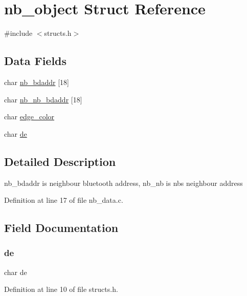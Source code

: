 \hypertarget{structnb__object}{}\section{nb\+\_\+object Struct Reference}
\label{structnb__object}


{\ttfamily \#include $<$structs.\+h$>$}

\subsection*{Data Fields}
\begin{DoxyCompactItemize}
\item 
char \mbox{\hyperlink{structnb__object_a1797d4245f78fe23bc470bba211a1f08}{nb\+\_\+bdaddr}} \mbox{[}18\mbox{]}
\item 
char \mbox{\hyperlink{structnb__object_a0de8d8aea3afc19931b2be5aee3b160e}{nb\+\_\+nb\+\_\+bdaddr}} \mbox{[}18\mbox{]}
\item 
char \mbox{\hyperlink{structnb__object_a888ab9b7cd2c4e983eea9cc143ff0e3c}{edge\+\_\+color}}
\item 
char \mbox{\hyperlink{structnb__object_a0925b75ec9001e20ab181316761261b0}{de}}
\end{DoxyCompactItemize}


\subsection{Detailed Description}
nb\+\_\+bdaddr is neighbour bluetooth address, nb\+\_\+nb is nb\textquotesingle{}s neighbour address 

Definition at line 17 of file nb\+\_\+data.\+c.



\subsection{Field Documentation}
\mbox{\label{structnb__object_a0925b75ec9001e20ab181316761261b0}} 
\subsubsection{\texorpdfstring{de}{de}}
{\footnotesize\ttfamily char de}



Definition at line 10 of file structs.\+h.

